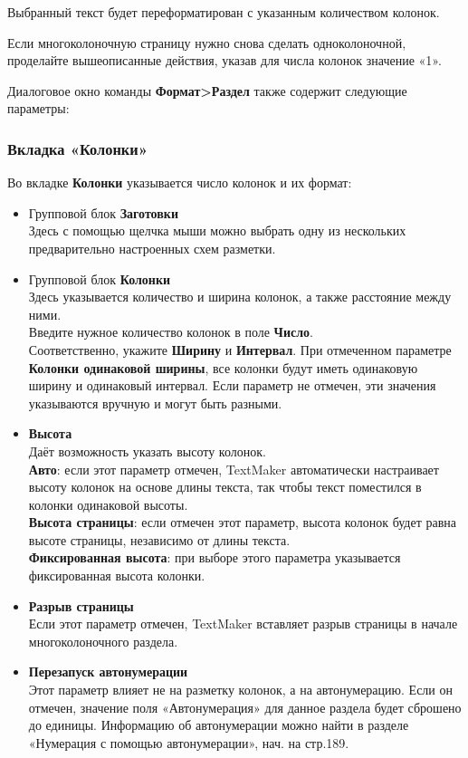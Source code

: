 \documentclass[a4paper,10pt]{article}
\begin{document}
Выбранный текст будет переформатирован с указанным количеством колонок.

Если многоколоночную страницу нужно снова сделать одноколоночной, проделайте вышеописанные действия, указав для числа колонок значение «1».

Диалоговое окно команды \textbf{Формат>Раздел} также содержит следующие параметры:

\subsubsection{Вкладка «Колонки»}
Во вкладке \textbf{Колонки} указывается число колонок и их формат:
\begin{itemize}
 \item Групповой блок \textbf{Заготовки}\\
 Здесь с помощью щелчка мыши можно выбрать одну из нескольких предварительно настроенных схем разметки.
 \item Групповой блок \textbf{Колонки}\\
 Здесь указывается количество и ширина колонок, а также расстояние между ними.\\
 Введите нужное количество колонок в поле \textbf{Число}.\\
 Соответственно, укажите \textbf{Ширину} и \textbf{Интервал}. При отмеченном параметре \textbf{Колонки одинаковой ширины}, все колонки будут иметь одинаковую ширину и одинаковый интервал. Если параметр не отмечен, эти значения указываются вручную и могут быть разными.
 \item \textbf{Высота}\\
 Даёт возможность указать высоту колонок.\\
 \textbf{Авто}: если этот параметр отмечен, TextMaker автоматически настраивает высоту колонок на основе длины текста, так чтобы текст поместился в колонки одинаковой высоты.\\
 \textbf{Высота страницы}: если отмечен этот параметр, высота колонок будет равна высоте страницы, независимо от длины текста.\\
 \textbf{Фиксированная высота}: при выборе этого параметра указывается фиксированная высота колонки.
 \item \textbf{Разрыв страницы}\\
 Если этот параметр отмечен, TextMaker вставляет разрыв страницы в начале многоколоночного раздела.
 \item \textbf{Перезапуск автонумерации}\\
 Этот параметр влияет не на разметку колонок, а на автонумерацию. Если он отмечен, значение поля «Автонумерация» для данное раздела будет сброшено до единицы. Информацию об автонумерации можно найти в разделе «Нумерация с помощью автонумерации», нач. на стр.189.

\end{itemize}
\end{document}
